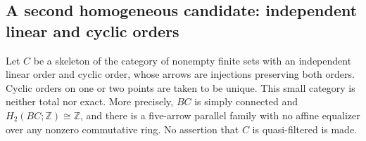 \subsection{A second homogeneous candidate: independent linear and cyclic orders}

\begin{proposition}
\label{A:cyclic-linear}
Let $C$ be a skeleton of the category of nonempty finite sets with
an independent linear order and cyclic order, whose arrows are
injections preserving both orders. Cyclic orders on one or two
points are taken to be unique. This small category is neither total
nor exact. More precisely, $BC$ is simply connected and
$H_2(BC;\mathbb Z)\cong\mathbb Z$, and there is a five-arrow parallel
family with no affine equalizer over any nonzero commutative ring.
No assertion that $C$ is quasi-filtered is made.
\end{proposition}
